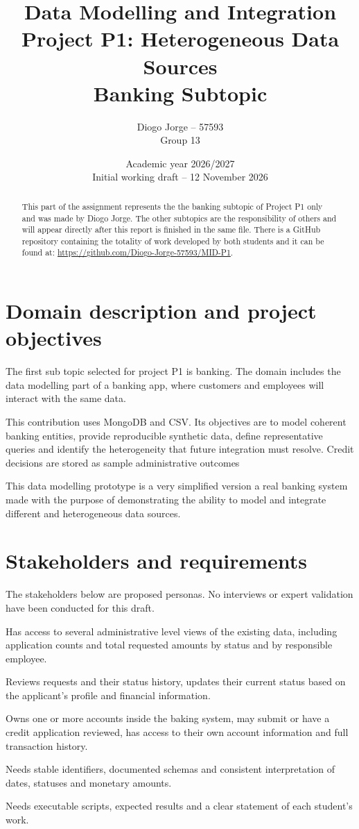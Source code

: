 \documentclass[11pt,a4paper]{article}
\title{Data Modelling and Integration\\Project P1: Heterogeneous Data Sources\\Banking Subtopic}
\author{Diogo Jorge -- 57593\\Group 13}
\date{Academic year 2026/2027\\Initial working draft -- 12 November 2026}
\begin{document}
\maketitle
\renewcommand{\abstractname}{Work Order and Declaration:}
\begin{abstract}
This part of the assignment represents the the banking subtopic of Project P1 only and
was made by Diogo Jorge. The other subtopics are the responsibility 
of others and will appear directly after
this report is finished in the same file. 
There is a GitHub repository containing the totality of work developed by both students 
and it can be found at: \url{https://github.com/Diogo-Jorge-57593/MID-P1}.

\end{abstract}

\section{Domain description and project objectives}
The first sub topic selected for project P1 is banking. The domain includes the 
data modelling part of a banking app, where customers and employees will interact
with the same data.

This contribution uses MongoDB and CSV. Its objectives are to model coherent
banking entities, provide reproducible synthetic data, define representative
queries and identify the heterogeneity that future integration must resolve.
Credit decisions are stored as sample administrative outcomes

This data modelling prototype is a very simplified version a real banking system 
made with the purpose of demonstrating the ability to model and integrate
different and heterogeneous data sources.

\section{Stakeholders and requirements}
The stakeholders below are proposed personas. No interviews or expert
validation have been conducted for this draft.
\begin{description}[style=nextline]
\item[Bank Manager] Has access to several administrative level views of the existing data, including application counts and total requested amounts by status and by responsible employee.
\item[Credit officer] Reviews requests and their status history, updates their current status based on the applicant's profile and financial information.
\item[Client] Owns one or more accounts inside the baking system, may submit or have a credit application reviewed, has access to their own account information and full transaction history.
\item[Integration developer] Needs stable identifiers, documented schemas and
consistent interpretation of dates, statuses and monetary amounts.
\item[Teacher/reviewer] Needs executable scripts, expected results and a clear
statement of each student's work.
\end{description}
\end{document}
